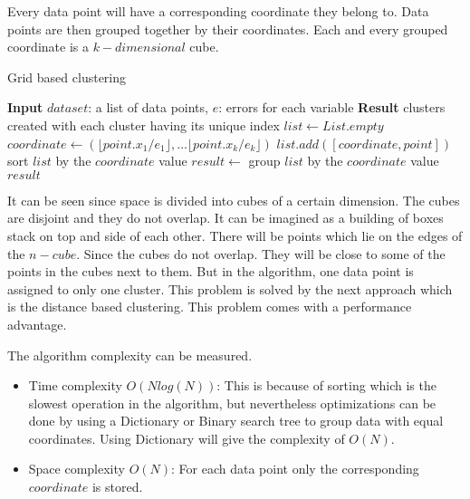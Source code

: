 Every data point will have a corresponding coordinate they belong to. Data points are then grouped together by their coordinates. Each and every grouped coordinate is a \(k-dimensional\) cube. 

\begin{algorithm}
    \caption{Grid based clustering}\label{alg:gridExistence}
    \begin{algorithmic}[1]
        \State \textbf{Input} $dataset$: a list of data points, $e$: errors for each variable
        \State \textbf{Result} clusters created with each cluster having its unique index
        \State $list \gets List.empty$
         
        \State $coordinate \gets (\lfloor point.x_{1}/e_1 \rfloor, \ldots \lfloor point.x_{k}/e_k \rfloor)$
        \State $list.add([coordinate, point])$
        \EndFor
        \State sort $list$ by the  $coordinate$ value 
        \State $result \gets$ group $list$ by the  $coordinate$ value 
        \State\Return $result$
        \EndProcedure
    \end{algorithmic}
\end{algorithm}

It can be seen since space is divided into cubes of a certain dimension. The cubes are disjoint and they do not overlap. It can be imagined as a building of boxes stack on top and side of each other. There will be points which lie on the edges of the \(n-cube\). Since the cubes do not overlap. They will be close to some of the points in the cubes next to them. But in the algorithm, one data point is assigned to only one cluster. This problem is solved by the next approach which is the distance based clustering. This problem comes with a performance advantage. 

The algorithm complexity can be measured. 
\begin{itemize}
    \item Time complexity \(O(N log(N))\): This is because of sorting which is the slowest operation in the algorithm, but nevertheless optimizations can be done by using a Dictionary or Binary search tree to group data with equal coordinates. Using Dictionary will give the complexity of \(O(N)\).
    \item Space complexity \(O(N)\): For each data point only the corresponding \(coordinate\) is stored.
\end{itemize}

